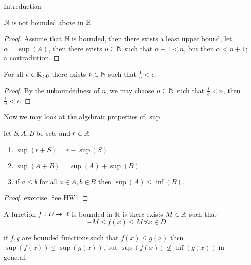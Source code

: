 \begin{chapter}{Introduction}
    \begin{lem}
        $\mathbb{N}$ is not bounded above in $\mathbb{R}$
    \end{lem}

    
    \begin{proof}
        Assume that $\mathbb{N}$ is bounded, then there exists a least upper bound, let $\alpha = \sup(A)$, then there exists $n \in \mathbb{N}$ such that $\alpha - 1 < n$, but then 
        $\alpha < n + 1$; a contradiction. 
    \end{proof}

    
    \begin{thm}
        For all $\epsilon \in \mathbb{R}_{>0}$ there exists $n \in \mathbb{N}$ such that $\frac{1}{n} < \epsilon$.
    \end{thm}

    
    \begin{proof}
        By the unboundedness of $n$, we may choose $n \in \mathbb{N}$ such that $\frac{1}{e} < n$, then $\frac{1}{n} < \epsilon$. 
    \end{proof}


    Now we may look at the algebraic properties of $\sup$ 

    
    \begin{thm}
        let $S, A, B$ be sets and $r \in \mathbb{R}$
        \begin{enumerate}
            \item $\sup(r + S) = r + \sup(S)$
            \item $\sup(A + B) = \sup(A) + \sup(B)$
            \item if $a \leq b$ for all $a \in A, b \in B$ then $\sup(A) \leq \inf(B)$.
        \end{enumerate}
    \end{thm}

    
    \begin{proof}
        exercise. See HW1
    \end{proof}


    
    
    \begin{defn}
        A function $f: D \to \mathbb{R}$ is bounded in $\mathbb{R}$ is there exists $M \in \mathbb{R}$ such that 
        \[-M \leq f(x) \leq M \, \forall x \in D\]
    \end{defn}

    
    \begin{lem}
        if $f, g$ are bounded functions such that $f(x) \leq g(x)$ then $\sup(f(x)) \leq \sup(g(x))$, but 
        $\sup(f(x)) \nleqslant \inf(g(x))$ in general. 
    \end{lem}


\end{chapter}
